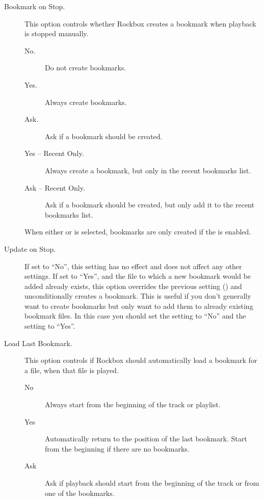   \begin{description}

  \item [Bookmark on Stop.]
    This option controls whether Rockbox creates a bookmark when playback is
    stopped manually.
    \begin{description}    
      \item[No.]
            Do not create bookmarks.
      \item[Yes.]
            Always create bookmarks.
      \item[Ask.]
            Ask if a bookmark should be created.
      \item[Yes -- Recent Only.]
            Always create a bookmark, but only in the recent bookmarks list.
      \item[Ask -- Recent Only.]
            Ask if a bookmark should be created, but only add it to the recent
            bookmarks list.
    \end{description}
    When either  or 
    is selected, bookmarks are only created if the  is enabled.
    
  \item [Update on Stop.]
    If set to ``No'', this setting has no effect and does not affect any other settings.
    If set to ``Yes'', and the file
    to which a new bookmark would be added already exists, this option overrides
    the previous setting () and unconditionally creates a
    bookmark. This is useful if you don't generally want to create bookmarks but
    only want to add them to already existing bookmark files. In this case you
    should set the setting  to ``No'' and the setting
     to ``Yes''.

  \item [Load Last Bookmark.]
    This option controls if Rockbox should automatically load a bookmark for
    a file, when that file is played.
    
    \begin{description}
      \item[No]
            Always start from the beginning of the track or playlist.
      \item[Yes]
            Automatically return to the position of the last bookmark. Start
            from the beginning if there are no bookmarks.
      \item[Ask]
            Ask if playback should start from the beginning of the track or
            from one of the bookmarks.
    \end{description}


\end{description}
